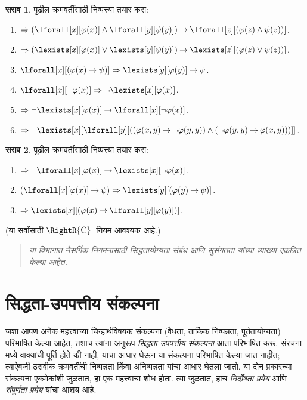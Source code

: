 \documentclass[11pt,a4paper,openany]{book}
\theoremstyle{definition}
\newtheorem{prob}{सराव}[chapter]
\newenvironment{explain}{}{}
\newcommand{\lif}{\mathbin{\to}}
\newenvironment{editorial}{\begin{quote}\small\itshape}{\end{quote}}
\newcommand{\Sequent}{\Rightarrow}
\newcommand{\Contraction}{\ensuremath{\mathrm{C}}}
\begin{document}
\begin{prob}
पुढील क्रमवर्तींसाठी निष्पत्त्या तयार करा:
\begin{enumerate}
\item $\Sequent (\lforall[x][\varphi(x)] \land \lforall[y][\psi(y)]) \lif
\lforall[z][(\varphi(z) \land \psi(z))]$.
\item $\Sequent (\lexists[x][\varphi(x)] \lor \lexists[y][\psi(y)]) \lif
\lexists[z][(\varphi(z) \lor \psi(z))]$.
\item $\lforall[x][(\varphi(x) \lif \psi)] \Sequent \lexists[y][\varphi(y)] \lif \psi$.
\item $\lforall[x][\lnot \varphi(x)] \Sequent \lnot\lexists[x][\varphi(x)]$.
\item $\Sequent \lnot\lexists[x][\varphi(x)] \lif \lforall[x][\lnot \varphi(x)]$.
\item $\Sequent \lnot\lexists[x][\lforall[y][((\varphi(x,y) \lif \lnot
\varphi(y,y)) \land (\lnot \varphi(y,y) \lif \varphi(x,y)))]]$.
\end{enumerate}
\end{prob}

\begin{prob}
पुढील क्रमवर्तींसाठी निष्पत्त्या तयार करा:
\begin{enumerate}
\item $\Sequent \lnot\lforall[x][\varphi(x)] \lif \lexists[x][\lnot\varphi(x)]$.
\item $(\lforall[x][\varphi(x)] \lif \psi) \Sequent \lexists[y][(\varphi(y) \lif \psi)]$.
\item $\Sequent \lexists[x][(\varphi(x) \lif \lforall[y][\varphi(y)])]$.
\end{enumerate}
(या सर्वांसाठी $\RightR{\Contraction}$~नियम आवश्यक आहे.)
\end{prob}







\begin{editorial}
  या विभागात नैसर्गिक निगमनासाठी सिद्धतायोग्यता संबंध आणि सुसंगतता यांच्या
  व्याख्या एकत्रित केल्या आहेत.
\end{editorial}



\section{सिद्धता-उपपत्तीय संकल्पना}\label{fol:seq:ptn:sec}

\begin{explain}
जशा आपण अनेक महत्त्वाच्या चिन्हार्थविषयक संकल्पना (वैधता, तार्किक निष्पन्नता,
पूर्ततायोग्यता) परिभाषित केल्या आहेत, तशाच त्यांना अनुरूप
\emph{सिद्धता-उपपत्तीय संकल्पना} आता परिभाषित करू. संरचना मध्ये
वाक्यांची पूर्ति होते की नाही, याचा आधार घेऊन या संकल्पना परिभाषित
केल्या जात नाहीत; त्याऐवजी ठरावीक क्रमवर्तींची निष्पन्नता किंवा
अनिष्पन्नता यांचा आधार घेतला जातो. या दोन प्रकारच्या संकल्पना
एकमेकांशी जुळतात, हा एक महत्त्वाचा शोध होता. त्या जुळतात, हाच
\emph{निर्दोषता प्रमेय} आणि \emph{संपूर्णता प्रमेय} यांचा आशय आहे.
\end{explain}
\end{document}
